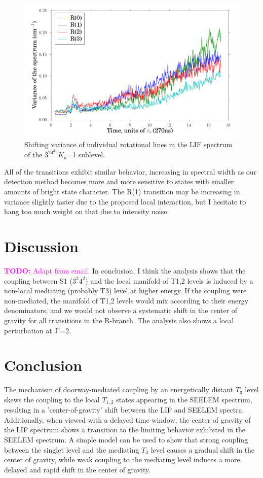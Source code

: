 \documentclass[12pt]{mitthesis}
\newcommand{\TODO} [1]{\textcolor{magenta}{\textbf{TODO:} #1}}
\begin{document}
\begin{figure}
  \caption{Shifting variance of individual rotational lines in the LIF
    spectrum of the $3^24^2$ $K_a$=1 sublevel.}
  \label{fig:32b2-var-delay}
  \centering
  \includegraphics[width=6in]{32b2-variance-delay.png}
\end{figure}

All of the transitions exhibit similar behavior, increasing in
spectral width as our detection method becomes more and more sensitive
to states with smaller amounts of bright state character.  The R(1)
transition may be increasing in variance slightly faster due to the
proposed local interaction, but I hesitate to hang too much weight on
that due to intensity noise.

\section{Discussion}

\TODO{Adapt from email.} In conclusion, I think the analysis shows
that the coupling between S1 ($3^2 4^2$) and the local manifold of
T1,2 levels is induced by a non-local mediating (probably T3) level at
higher energy.  If the coupling were non-mediated, the manifold of
T1,2 levels would mix according to their energy denominators, and we
would not observe a systematic shift in the center of gravity for all
transitions in the R-branch.  The analysis also shows a local
perturbation at J'=2.

\section{Conclusion}

The mechanism of doorway-mediated coupling by an energetically distant
$T_3$ level skews the coupling to the local $T_{1,2}$ states appearing
in the SEELEM spectrum, resulting in a 'center-of-gravity' shift
between the LIF and SEELEM spectra.  Additionally, when viewed with a
delayed time window, the center of gravity of the LIF spectrum shows a
transition to the limiting behavior exhibited in the SEELEM spectrum.
A simple model can be used to show that strong coupling between the
singlet level and the mediating $T_3$ level causes a gradual shift in
the center of gravity, while weak coupling to the mediating level
induces a more delayed and rapid shift in the center of gravity.
\end{document}

